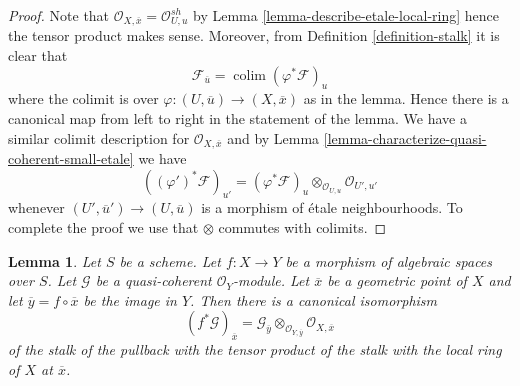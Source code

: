 \documentclass{stacks-project}
\theoremstyle{plain}
\newtheorem{lemma}[subsection]{Lemma}
\theoremstyle{definition}
\theoremstyle{remark}
\numberwithin{equation}{subsection}
\def\colim{\mathop{\mathrm{colim}}\nolimits}
\begin{document}
\begin{proof}
Note that $\mathcal{O}_{X, \overline{x}} = \mathcal{O}_{U, u}^{sh}$ by
Lemma \ref{lemma-describe-etale-local-ring}
hence the tensor product makes sense. Moreover, from
Definition \ref{definition-stalk}
it is clear that
$$
\mathcal{F}_{\overline{u}} = \colim (\varphi^*\mathcal{F})_u
$$
where the colimit is over $\varphi : (U, \overline{u}) \to (X, \overline{x})$
as in the lemma. Hence there is a canonical map from left to right in
the statement of the lemma. We have a similar colimit description for
$\mathcal{O}_{X, \overline{x}}$
and by
Lemma \ref{lemma-characterize-quasi-coherent-small-etale}
we have
$$
((\varphi')^*\mathcal{F})_{u'} =
(\varphi^*\mathcal{F})_u \otimes_{\mathcal{O}_{U, u}} \mathcal{O}_{U', u'}
$$
whenever $(U', \overline{u}') \to (U, \overline{u})$ is a morphism of
\'etale neighbourhoods. To complete the proof we use that
$\otimes$ commutes with colimits.
\end{proof}

\begin{lemma}
\label{lemma-stalk-pullback-quasi-coherent}
Let $S$ be a scheme. Let $f : X \to Y$ be a morphism of algebraic spaces
over $S$. Let $\mathcal{G}$ be a quasi-coherent $\mathcal{O}_Y$-module.
Let $\overline{x}$ be a geometric point of $X$ and let
$\overline{y} = f \circ \overline{x}$ be the image in $Y$.
Then there is a canonical isomorphism
$$
(f^*\mathcal{G})_{\overline{x}} =
\mathcal{G}_{\overline{y}} \otimes_{\mathcal{O}_{Y, \overline{y}}}
\mathcal{O}_{X, \overline{x}}
$$
of the stalk of the pullback with the tensor product of the stalk
with the local ring of $X$ at $\overline{x}$.
\end{lemma}
\end{document}

